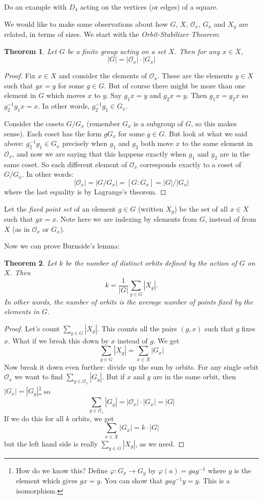 \documentclass[12pt]{article}
\theoremstyle{plain}
\newtheorem*{theorem}{Theorem}
\theoremstyle{definition}
\theoremstyle{remark}
\def\inv{^{-1}}
\begin{document}
Do an example with $D_4$ acting on the vertices (or edges) of a square.  

We would like to make some observations about how $G$, $X$, $\mathcal{O}_x$, $G_x$ and $X_g$ are related, in terms of sizes.  We start with the {\em Orbit-Stabilizer Theorem}:

\begin{theorem}
Let $G$ be a finite group acting on a set $X$.  Then for any $x \in X$,
\[|G| = |\mathcal{O}_x|\cdot |G_x|\]
\end{theorem}

\begin{proof}
Fix $x \in X$ and consider the elements of $\mathcal{O}_x$.  These are the elements $y \in X$ such that $gx = y$ for some $g \in G$.  But of course there might be more than one element in $G$ which moves $x$ to $y$.  Say $g_1x = y$ and $g_2x = y$.  Then $g_1x = g_2x$ so $g_2\inv g_1 x = x$.  In other words, $g_2\inv g_1 \in G_x$.  

Consider the cosets $G/G_x$ (remember $G_x$ is a subgroup of $G$, so this makes sense).    Each coset has the form $gG_x$ for some $g \in G$.  But look at what we said above: $g_2\inv g_1 \in G_x$ precisely when $g_1$ and $g_2$ both move $x$ to the same element in $\mathcal{O}_x$, and now we are saying that this happens exactly when $g_1$ and $g_2$ are in the same coset.  So each different element of $\mathcal{O}_x$ corresponds exactly to a coset of $G/G_x$.  In other words:
\[|\mathcal{O}_x| = |G/G_x| = [G:G_x] = |G|/|G_x|\]
where the last equality is by Lagrange's theorem. 
\end{proof}

\newpage
Let the {\em fixed point set} of an element $g \in G$ (written $X_g$) be the set of all $x \in X$ such that $gx = x$.  Note here we are indexing by elements from $G$, instead of from $X$ (as in $\mathcal{O}_x$ or $G_x$).

Now we can prove Burnside's lemma:


\begin{theorem}
Let $k$ be the number of distinct orbits defined by the action of $G$ on $X$.  Then
\[k = \frac{1}{|G|}\sum_{g \in G}|X_g|.\]
In other words, the number of orbits is the average number of points fixed by the elements in $G$.
\end{theorem}

\begin{proof}
Let's count $\sum_{g\in G} |X_g|$.  This counts all the pairs $(g,x)$ such that $g$ fixes $x$.  What if we break this down by $x$ instead of $g$.  We get
\[\sum_{g\in G} |X_g| = \sum_{x\in X} |G_x|\]
Now break it down even further: divide up the sum by orbits.  For any single orbit $\mathcal{O}_x$ we want to find $\sum_{y \in \mathcal{O}_x} |G_y|$.  But if $x$ and $y$ are in the same orbit, then $|G_x| = |G_y|$\footnote{How do we know this?  Define $\varphi:G_x \to G_y$ by $\varphi(a) = gag\inv$ where $g$ is the element which gives $gx = y$.  You can show that $gag\inv y = y$.  This is a isomorphism.} so
\[\sum_{y \in \mathcal{O}_x} |G_y| = |\mathcal{O}_x|\cdot |G_x| = |G|\]
If we do this for all $k$ orbits, we get 
\[\sum_{x \in X} |G_x| = k\cdot |G|\]
but the left hand side is really $\sum_{g\in G} |X_g|$, as we need.
\end{proof}
\end{document}
